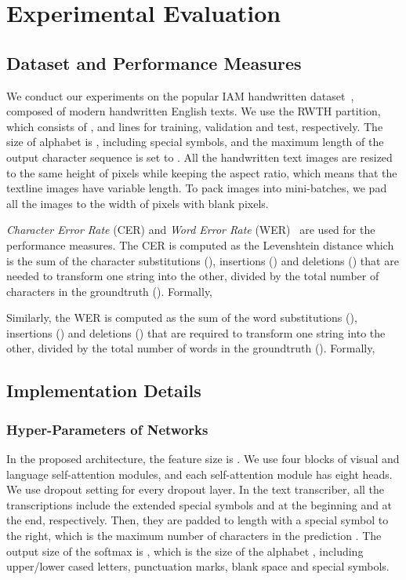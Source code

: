 \documentclass[10pt,twocolumn,letterpaper]{article}
\begin{document}
\section{Experimental Evaluation}
\subsection{Dataset and Performance Measures}
We conduct our experiments on the popular IAM handwritten dataset~\cite{marti2002iam}, composed of modern handwritten English texts. We use the RWTH partition, which consists of ,  and  lines for training, validation and test, respectively. The size of alphabet  is , including special symbols, and the maximum length of the output character sequence is set to . All the handwritten text images are resized to the same height of  pixels while keeping the aspect ratio, which means that the textline images have variable length. To pack images into mini-batches, we pad all the images to the width of  pixels with blank pixels.

\emph{Character Error Rate} (CER) and \emph{Word Error Rate} (WER)~\cite{frinken2014continuous} are used for the performance measures. The CER is computed as the Levenshtein distance which is the sum of the character substitutions (), insertions () and deletions () that are needed to transform one string into the other, divided by the total number of characters in the groundtruth (). Formally, 
    
Similarly, the WER is computed as the sum of the word substitutions (), insertions () and deletions () that are required to transform one string into the other, divided by the total number of words in the groundtruth (). Formally,
	

\subsection{Implementation Details}




\subsubsection{Hyper-Parameters of Networks}
In the proposed architecture, the feature size  is . We use four blocks of visual and language self-attention modules, and each self-attention module has eight heads. We use  dropout setting for every dropout layer. In the text transcriber, all the transcriptions include the extended special symbols  and  at the beginning and at the end, respectively. Then, they are padded to  length with a special symbol  to the right, which is the maximum number of characters in the prediction . The output size of the softmax is , which is the size of the alphabet , including upper/lower cased letters, punctuation marks, blank space and special symbols.
\end{document}
